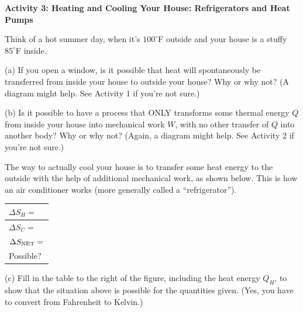 \textbf{Activity 3: Heating and Cooling Your House: Refrigerators and Heat Pumps}

Think of a hot summer day, when it's $100^\circ$F outside and your house is a stuffy $85^\circ$F inside.  

(a) If you open a window, is it possible that heat will spontaneously be transferred from inside your house to outside your house?  Why or why not?  (A diagram might help.  See Activity 1 if you're not sure.)
\answerspace{1.2 in}

(b) Is it possible to have a process that ONLY transforms some thermal energy $Q$ from inside your house into mechanical work $W$, with no other transfer of $Q$ into another body?  Why or why not?  (Again, a diagram might help.  See Activity 2 if you're not sure.)
\answerspace{1.2 in}

The way to actually cool your house is to transfer some heat energy to the outside with the help of additional mechanical work, as shown below.  This is how an air conditioner works (more generally called a ``refrigerator'').

\begin{center}
\vspace{-0.1 in}
\hspace{0.3in}
{\renewcommand{\arraystretch}{1.8}
\begin{tabular}{|L{1.6in}|} 
\hline $\Delta S_H =$ \\ 
\hline $\Delta S_C =$ \\ 
\hline $\Delta S_{\rm NET} =$ \\ 
\hline Possible? \\ 
\hline 
\end{tabular} 
}
\vspace{-0.1 in}
\end{center}

(c) Fill in the table to the right of the figure, including the heat energy $Q_H$, to show that the situation above is possible for the quantities given.  (Yes, you have to convert from Fahrenheit to Kelvin.)
\answerspace{0.2 in}

